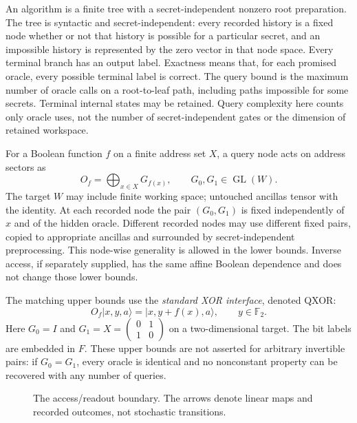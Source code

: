 \documentclass[11pt]{article}
\newcommand{\F}{\mathbb F}
\DeclareMathOperator{\GL}{GL}
\begin{document}
An algorithm is a finite tree with a secret-independent nonzero root preparation. The tree is syntactic and secret-independent: every recorded history is a fixed node whether or not that history is possible for a particular secret, and an impossible history is represented by the zero vector in that node space. Every terminal branch has an output label. Exactness means that, for each promised oracle, every possible terminal label is correct. The query bound is the maximum number of oracle calls on a root-to-leaf path, including paths impossible for some secrets. Terminal internal states may be retained. Query complexity here counts only oracle uses, not the number of secret-independent gates or the dimension of retained workspace.

For a Boolean function $f$ on a finite address set $X$, a query node acts on address sectors as
\begin{equation}\label{eq:oracle}
 O_f=\bigoplus_{x\in X}G_{f(x)},\qquad G_0,G_1\in\GL(W).
\end{equation}
The target $W$ may include finite working space; untouched ancillas tensor with the identity. At each recorded node the pair $(G_0,G_1)$ is fixed independently of $x$ and of the hidden oracle. Different recorded nodes may use different fixed pairs, copied to appropriate ancillas and surrounded by secret-independent preprocessing. This node-wise generality is allowed in the lower bounds. Inverse access, if separately supplied, has the same affine Boolean dependence and does not change those lower bounds.

The matching upper bounds use the \emph{standard XOR interface}, denoted QXOR:
\[
 O_f\lvert x,y,a\rangle=\lvert x,y+f(x),a\rangle,
 \qquad y\in\F_2.
\]
Here $G_0=I$ and $G_1=X=\left(\begin{smallmatrix}0&1\\1&0\end{smallmatrix}\right)$ on a two-dimensional target. The bit labels are embedded in $F$. These upper bounds are not asserted for arbitrary invertible pairs: if $G_0=G_1$, every oracle is identical and no nonconstant property can be recovered with any number of queries.

\begin{figure}[ht]\centering
{}
\caption{The access/readout boundary. The arrows denote linear maps and recorded outcomes, not stochastic transitions.}\label{fig:contract}
\end{figure}
\end{document}
